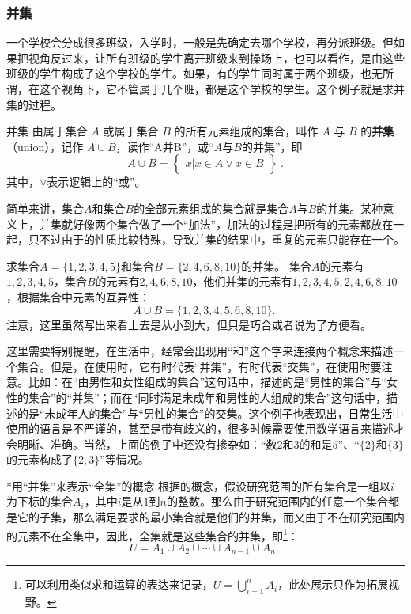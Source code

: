 \subsubsection{并集}

一个学校会分成很多班级，入学时，一般是先确定去哪个学校，再分派班级。但如果把视角反过来，让所有班级的学生离开班级来到操场上，也可以看作，是由这些班级的学生构成了这个学校的学生。如果，有的学生同时属于两个班级，也无所谓，在这个视角下，它不管属于几个班，都是这个学校的学生。这个例子就是求并集的过程。

\begin{definition}{并集}
由属于集合 $A$ 或属于集合 $B$ 的所有元素组成的集合，叫作 $A$ 与 $B$ 的\textbf{并集}（union），记作 $A\cup B$，读作“A并B”，或“$A$与$B$的并集”，即
\begin{equation}
A\cup B = \begin{Bmatrix}x|x\in A \lor x\in B\end{Bmatrix}~.
\end{equation}
其中，$\lor$表示逻辑上的“或”。
\end{definition}

简单来讲，集合$A$和集合$B$的全部元素组成的集合就是集合$A$与$B$的并集。某种意义上，并集就好像两个集合做了一个“加法”，加法的过程是把所有的元素都放在一起，只不过由于的性质比较特殊，导致并集的结果中，重复的元素只能存在一个。

\begin{example}{求集合$A=\{1,2,3,4,5\}$和集合$B=\{2,4,6,8,10\}$的并集。}\label{ex_HsSeOp_1}
集合$A$的元素有$1,2,3,4,5$，集合$B$的元素有$2,4,6,8,10$，他们并集的元素有$1,2,3,4,5,2,4,6,8,10$，根据集合中元素的互异性：
$$
A\cup B=\{1,2,3,4,5,6,8,10\}.~
$$
注意，这里虽然写出来看上去是从小到大，但只是巧合或者说为了方便看。
\end{example}

这里需要特别提醒，在生活中，经常会出现用“和”这个字来连接两个概念来描述一个集合。但是，在使用时，它有时代表“并集”，有时代表“交集”，在使用时要注意。比如：在“由男性和女性组成的集合”这句话中，描述的是“男性的集合”与“女性的集合”的“并集”；而在“同时满足未成年和男性的人组成的集合”这句话中，描述的是“未成年人的集合”与“男性的集合”的交集。这个例子也表现出，日常生活中使用的语言是不严谨的，甚至是带有歧义的，很多时候需要使用数学语言来描述才会明晰、准确。当然，上面的例子中还没有掺杂如：“数$2$和$3$的和是$5$”、“$\{2\}$和$\{3\}$的元素构成了$\{2,3\}$”等情况。

\begin{example}{*用“并集”来表示“全集”的概念}
根据的概念，假设研究范围的所有集合是一组以$i$为下标的集合$A_i$，其中$i$是从$1$到$n$的整数。那么由于研究范围内的任意一个集合都是它的子集，那么满足要求的最小集合就是他们的并集，而又由于不在研究范围内的元素不在全集中，因此，全集就是这些集合的并集，即\footnote{可以利用类似求和运算的表达来记录，$\displaystyle U=\bigcup_{i=1}^n A_i$，此处展示只作为拓展视野。}：
$$
U=A_1\cup A_2\cup \cdots \cup A_{n-1}\cup A_n.~
$$
\end{example}


